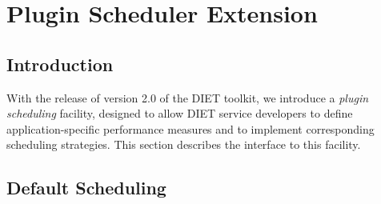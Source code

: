 

\newenvironment{code}
{\begin{list}{}{\setlength{\leftmargin}{1em}}\item\bfseries\tt}
{\end{list}}

\newenvironment{tinycode}
{\begin{list}{}{\setlength{\leftmargin}{1em}}\item\tiny\bfseries\tt}
{\end{list}}


\chapter{Plugin Scheduler Extension}
\label{ch:plugin}

\section{Introduction}

With the release of version 2.0 of the DIET toolkit, we introduce a
\emph{plugin scheduling} facility, designed to allow DIET service
developers to define application-specific performance measures and
to implement corresponding scheduling strategies.  This section
describes the interface to this facility.

\section{Default Scheduling}


